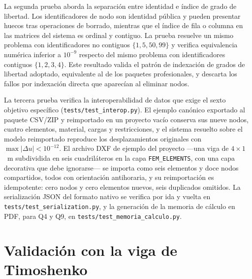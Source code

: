 La segunda prueba aborda la separación entre identidad e índice de grado de libertad. Los identificadores de nodo son identidad pública y pueden presentar huecos tras operaciones de borrado, mientras que el índice de fila o columna en las matrices del sistema es ordinal y contiguo. La prueba resuelve un mismo problema con identificadores no contiguos $\{1,5,50,99\}$ y verifica equivalencia numérica inferior a $10^{-9}$ respecto del mismo problema con identificadores contiguos $\{1,2,3,4\}$. Este resultado valida el patrón de indexación de grados de libertad adoptado, equivalente al de los paquetes profesionales, y descarta los fallos por indexación directa que aparecían al eliminar nodos.

La tercera prueba verifica la interoperabilidad de datos que exige el sexto objetivo específico (\texttt{tests/test\_interop.py}). El ejemplo canónico exportado al paquete CSV/ZIP y reimportado en un proyecto vacío conserva sus nueve nodos, cuatro elementos, material, cargas y restricciones, y el sistema resuelto sobre el modelo reimportado reproduce los desplazamientos originales con $\max|\Delta u| < 10^{-12}$. El archivo DXF de ejemplo del proyecto —una viga de $4\times1$~m subdividida en seis cuadriláteros en la capa \texttt{FEM\_ELEMENTS}, con una capa decorativa que debe ignorarse— se importa como seis elementos y doce nodos compartidos, todos con orientación antihoraria, y su reimportación es idempotente: cero nodos y cero elementos nuevos, seis duplicados omitidos. La serialización JSON del formato nativo se verifica por ida y vuelta en \texttt{tests/test\_serialization.py}, y la generación de la memoria de cálculo en PDF, para Q4 y Q9, en \texttt{tests/test\_memoria\_calculo.py}.

\section{Validación con la viga de Timoshenko}
\label{sec:timoshenko}

